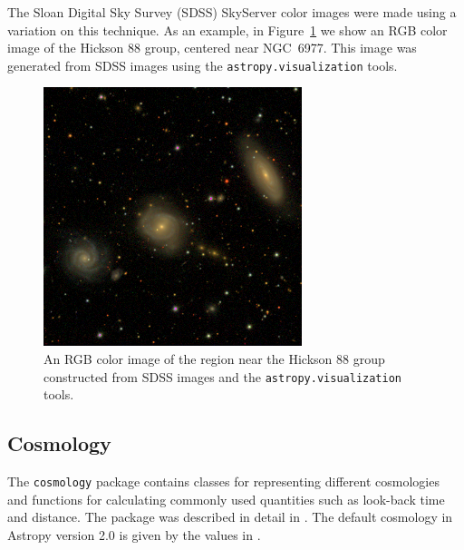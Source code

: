 \documentclass[modern]{aastex61}
\newcommand{\package}[1]{\texttt{#1}\xspace}
\newcommand{\astropy}{Astropy\xspace}
\renewcommand{\figurename}{Figure\xspace}
\begin{document}
The Sloan Digital Sky Survey (SDSS) SkyServer color images were made using a variation on this technique.  As an example, in \figurename~\ref{fig:ngc6977} we show an RGB color image of the Hickson 88 group, centered near NGC~6977.  This image was generated from SDSS images using the \package{astropy.visualization} tools.

\begin{figure}
\includegraphics[width=\textwidth]{ngc6977.png}
\caption{An RGB color image of the region near the Hickson 88 group
constructed from SDSS images and the \package{astropy.visualization}
tools.
\label{fig:ngc6977}}
\end{figure}


\subsection{Cosmology}

The \package{cosmology} package contains classes for representing different cosmologies and functions for calculating commonly used quantities such as look-back time and distance.   The package was described in detail in \cite{astropy}.  The default cosmology in \astropy version 2.0 is given by the values in \cite{2016A&A...594A..13P}.
\end{document}
